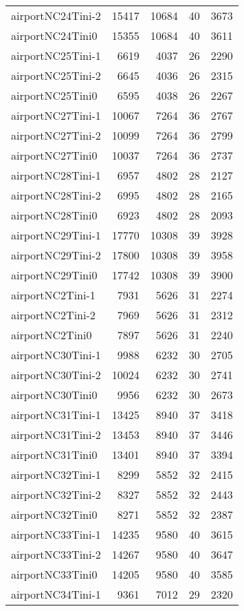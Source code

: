 \begin{longtable}{lrrrr}
airportNC24Tini-2 & 15417 & 10684 & 40 & 3673 \\
airportNC24Tini0 & 15355 & 10684 & 40 & 3611 \\
airportNC25Tini-1 & 6619 & 4037 & 26 & 2290 \\
airportNC25Tini-2 & 6645 & 4036 & 26 & 2315 \\
airportNC25Tini0 & 6595 & 4038 & 26 & 2267 \\
airportNC27Tini-1 & 10067 & 7264 & 36 & 2767 \\
airportNC27Tini-2 & 10099 & 7264 & 36 & 2799 \\
airportNC27Tini0 & 10037 & 7264 & 36 & 2737 \\
airportNC28Tini-1 & 6957 & 4802 & 28 & 2127 \\
airportNC28Tini-2 & 6995 & 4802 & 28 & 2165 \\
airportNC28Tini0 & 6923 & 4802 & 28 & 2093 \\
airportNC29Tini-1 & 17770 & 10308 & 39 & 3928 \\
airportNC29Tini-2 & 17800 & 10308 & 39 & 3958 \\
airportNC29Tini0 & 17742 & 10308 & 39 & 3900 \\
airportNC2Tini-1 & 7931 & 5626 & 31 & 2274 \\
airportNC2Tini-2 & 7969 & 5626 & 31 & 2312 \\
airportNC2Tini0 & 7897 & 5626 & 31 & 2240 \\
airportNC30Tini-1 & 9988 & 6232 & 30 & 2705 \\
airportNC30Tini-2 & 10024 & 6232 & 30 & 2741 \\
airportNC30Tini0 & 9956 & 6232 & 30 & 2673 \\
airportNC31Tini-1 & 13425 & 8940 & 37 & 3418 \\
airportNC31Tini-2 & 13453 & 8940 & 37 & 3446 \\
airportNC31Tini0 & 13401 & 8940 & 37 & 3394 \\
airportNC32Tini-1 & 8299 & 5852 & 32 & 2415 \\
airportNC32Tini-2 & 8327 & 5852 & 32 & 2443 \\
airportNC32Tini0 & 8271 & 5852 & 32 & 2387 \\
airportNC33Tini-1 & 14235 & 9580 & 40 & 3615 \\
airportNC33Tini-2 & 14267 & 9580 & 40 & 3647 \\
airportNC33Tini0 & 14205 & 9580 & 40 & 3585 \\
airportNC34Tini-1 & 9361 & 7012 & 29 & 2320 \\

\end{longtable}
